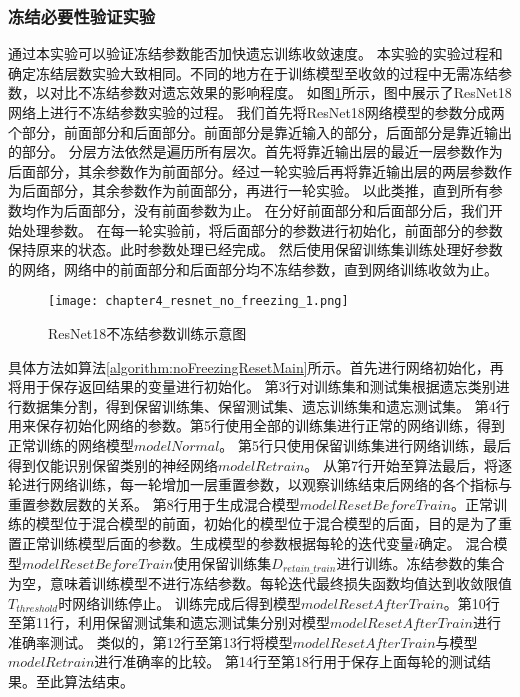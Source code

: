 \subsubsection{冻结必要性验证实验}

通过本实验可以验证冻结参数能否加快遗忘训练收敛速度。
本实验的实验过程和确定冻结层数实验大致相同。不同的地方在于训练模型至收敛的过程中无需冻结参数，以对比不冻结参数对遗忘效果的影响程度。
如图\ref{fig:chapter4_resnet_no_freezing_1}所示，图中展示了ResNet18网络上进行不冻结参数实验的过程。
我们首先将ResNet18网络模型的参数分成两个部分，前面部分和后面部分。前面部分是靠近输入的部分，后面部分是靠近输出的部分。
分层方法依然是遍历所有层次。首先将靠近输出层的最近一层参数作为后面部分，其余参数作为前面部分。经过一轮实验后再将靠近输出层的两层参数作为后面部分，其余参数作为前面部分，再进行一轮实验。
以此类推，直到所有参数均作为后面部分，没有前面参数为止。
在分好前面部分和后面部分后，我们开始处理参数。
在每一轮实验前，将后面部分的参数进行初始化，前面部分的参数保持原来的状态。此时参数处理已经完成。
然后使用保留训练集训练处理好参数的网络，网络中的前面部分和后面部分均不冻结参数，直到网络训练收敛为止。
\begin{figure}
    \centering
    \texttt{[image: chapter4\_resnet\_no\_freezing\_1.png]}
    \caption{ResNet18不冻结参数训练示意图}
    \label{fig:chapter4_resnet_no_freezing_1}
\end{figure}

具体方法如算法\ref{algorithm:noFreezingResetMain}所示。首先进行网络初始化，再将用于保存返回结果的变量进行初始化。
第3行对训练集和测试集根据遗忘类别进行数据集分割，得到保留训练集、保留测试集、遗忘训练集和遗忘测试集。
第4行用来保存初始化网络的参数。第5行使用全部的训练集进行正常的网络训练，得到正常训练的网络模型$modelNormal$。
第5行只使用保留训练集进行网络训练，最后得到仅能识别保留类别的神经网络$modelRetrain$。
从第7行开始至算法最后，将逐轮进行网络训练，每一轮增加一层重置参数，以观察训练结束后网络的各个指标与重置参数层数的关系。
第8行用于生成混合模型$modelResetBeforeTrain$。正常训练的模型位于混合模型的前面，初始化的模型位于混合模型的后面，目的是为了重置正常训练模型后面的参数。生成模型的参数根据每轮的迭代变量$i$确定。
混合模型$modelResetBeforeTrain$使用保留训练集$D_{retain\_train}$进行训练。冻结参数的集合为空，意味着训练模型不进行冻结参数。每轮迭代最终损失函数均值达到收敛限值$T_{threshold}$时网络训练停止。
训练完成后得到模型$modelResetAfterTrain$。第10行至第11行，利用保留测试集和遗忘测试集分别对模型$modelResetAfterTrain$进行准确率测试。
类似的，第12行至第13行将模型$modelResetAfterTrain$与模型$modelRetrain$进行准确率的比较。
第14行至第18行用于保存上面每轮的测试结果。至此算法结束。

